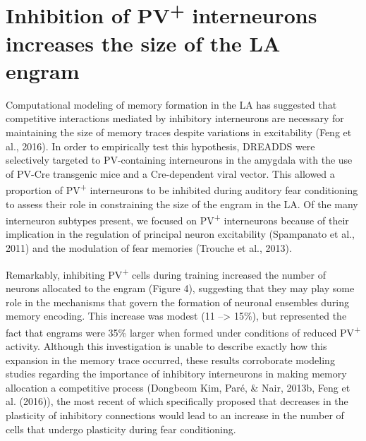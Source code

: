 \documentclass[12pt,a4paperpaper,]{report}
\begin{document}
\section{\texorpdfstring{Inhibition of PV\textsuperscript{+}
interneurons increases the size of the LA
engram}{Inhibition of PV+ interneurons increases the size of the LA engram}}\label{inhibition-of-pv-interneurons-increases-the-size-of-the-la-engram}

Computational modeling of memory formation in the LA has suggested that
competitive interactions mediated by inhibitory interneurons are
necessary for maintaining the size of memory traces despite variations
in excitability (Feng et al., 2016). In order to empirically test this
hypothesis, DREADDS were selectively targeted to PV-containing
interneurons in the amygdala with the use of PV-Cre transgenic mice and
a Cre-dependent viral vector. This allowed a proportion of
PV\textsuperscript{+} interneurons to be inhibited during auditory fear
conditioning to assess their role in constraining the size of the engram
in the LA. Of the many interneuron subtypes present, we focused on
PV\textsuperscript{+} interneurons because of their implication in the
regulation of principal neuron excitability (Spampanato et al., 2011)
and the modulation of fear memories (Trouche et al., 2013).

Remarkably, inhibiting PV\textsuperscript{+} cells during training
increased the number of neurons allocated to the engram (Figure 4),
suggesting that they may play some role in the mechanisms that govern
the formation of neuronal ensembles during memory encoding. This
increase was modest (11 --\textgreater{} 15\%), but represented the fact
that engrams were 35\% larger when formed under conditions of reduced
PV\textsuperscript{+} activity. Although this investigation is unable to
describe exactly how this expansion in the memory trace occurred, these
results corroborate modeling studies regarding the importance of
inhibitory interneurons in making memory allocation a competitive
process (Dongbeom Kim, Paré, \& Nair, 2013b, Feng et al. (2016)), the
most recent of which specifically proposed that decreases in the
plasticity of inhibitory connections would lead to an increase in the
number of cells that undergo plasticity during fear conditioning.
\end{document}
